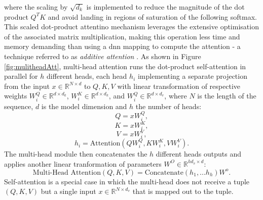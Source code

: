 where the scaling by $\sqrt{d_k}$ is implemented to reduce the magnitude of the dot product $Q^T K$ and avoid landing in regions of saturation of the following softmax. This scaled dot-product attentino mechanism leverages the extensive optimisation of the associated matrix multiplication, making this operation less time and memory demanding than using a \gls{dnn} mapping to compute the attention - a technique referred to as \textit{additive attention} \cite{Bahdanau2014NeuralMT}. As shown in Figure \ref{fig:mulitheadAtt}, multi-head attention runs the dot-product self-attention in parallel for $h$ different heads, each head $h_i$ implementing a separate projection from the input $x \in \mathbb{R}^{N \times d}$ to $Q, K, V$ with linear transformation of respective weights $W_i^Q \in \mathbb{R}^{d \times d_k}$, $W_i^K \in \mathbb{R}^{d \times d_k}$, and $W_i^Q \in \mathbb{R}^{d \times d_v}$, where $N$ is the length of the sequence, $d$ is the model dimension and $h$ the number of heads: \[Q = xW_i^Q,\] \[K = xW_i^K,\] \[V = xW_i^V,\] \[h_i = \text{Attention}(QW_i^Q, KW_i^K, VW_i^V).\] The multi-head module then concatenates the $h$ different heads outputs and applies another linear tranformation of parameters $W^O \in \mathbb{R}^{hd_v \times d}$: \[\text{Multi-Head Attention}(Q, K, V) = \text{Concatenate}(h_1, ...h_h)W^o .\] Self-attention is a special case in which the multi-head does not receive a tuple $(Q, K, V)$ but a single input $x \in \mathbb{R}^{N \times d_v}$ that is mapped out to the tuple. 

